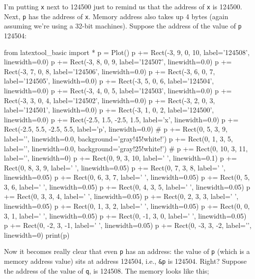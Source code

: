 I'm putting \texttt{x} next to 124500 just to remind us that the address of \texttt{x} is 124500. Next, \texttt{p} has the address of \texttt{x}.
Memory address also takes up 4 bytes (again assuming we're using a 32-bit machines). Suppose the address of the value of \texttt{p} 124504:

\begin{python}
from latextool_basic import *
p = Plot()
p += Rect(-3, 9, 0, 10, label='124508', linewidth=0.0)
p += Rect(-3, 8, 0, 9, label='124507', linewidth=0.0)
p += Rect(-3, 7, 0, 8, label='124506', linewidth=0.0)
p += Rect(-3, 6, 0, 7, label='124505', linewidth=0.0)
p += Rect(-3, 5, 0, 6, label='124504', linewidth=0.0)
p += Rect(-3, 4, 0, 5, label='124503', linewidth=0.0)
p += Rect(-3, 3, 0, 4, label='124502', linewidth=0.0)
p += Rect(-3, 2, 0, 3, label='124501', linewidth=0.0)
p += Rect(-3, 1, 0, 2, label='124500', linewidth=0.0)
p += Rect(-2.5, 1.5, -2.5, 1.5, label='x', linewidth=0.0)
p += Rect(-2.5, 5.5, -2.5, 5.5, label='p', linewidth=0.0)
#
p += Rect(0, 5, 3, 9, label='', linewidth=0.0, background='gray!45!white!')
p += Rect(0, 1, 3, 5, label='', linewidth=0.0, background='gray!25!white!')
#
p += Rect(0, 10, 3, 11, label='', linewidth=0)
p += Rect(0, 9, 3, 10, label=' ', linewidth=0.1)
p += Rect(0, 8, 3, 9, label=' ', linewidth=0.05)
p += Rect(0, 7, 3, 8, label=' ', linewidth=0.05)
p += Rect(0, 6, 3, 7, label=' ', linewidth=0.05)
p += Rect(0, 5, 3, 6, label=' ', linewidth=0.05)
p += Rect(0, 4, 3, 5, label=' ', linewidth=0.05)
p += Rect(0, 3, 3, 4, label=' ', linewidth=0.05)
p += Rect(0, 2, 3, 3, label=' ', linewidth=0.05)
p += Rect(0, 1, 3, 2, label=' ', linewidth=0.05)
p += Rect(0, 0, 3, 1, label=' ', linewidth=0.05)
p += Rect(0, -1, 3, 0, label=' ', linewidth=0.05)
p += Rect(0, -2, 3, -1, label=' ', linewidth=0.05)
p += Rect(0, -3, 3, -2, label='', linewidth=0)
print(p)
\end{python}

Now it becomes really clear that even \texttt{p} has an address: the value of \texttt{p} (which is a memory address value) sits at address 124504, i.e., \texttt{\&p} is 124504. Right? Suppose the address of the value of \texttt{q}, is 124508. The memory looks like this;


